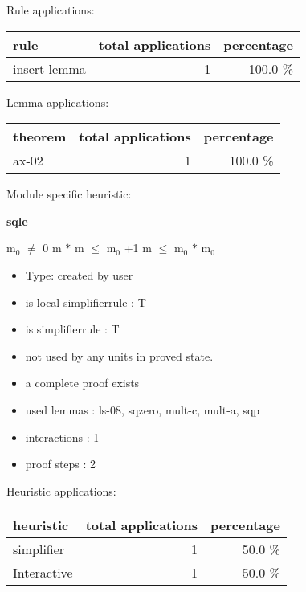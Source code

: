 \documentclass[a4paper]{article}
\begin{document}
Rule applications:

\begin{supertabular}{l|r|r}
rule	        & total applications & percentage \\ \hline
insert lemma & 1 & 100.0 \% \\

\end{supertabular}

Lemma applications:

\begin{supertabular}{l|r|r}
theorem	        & total applications & percentage \\ \hline
ax-02 & 1 & 100.0 \% \\

\end{supertabular}

Module specific heuristic:

\pagebreak

{\LARGE\bf sqle}\label{lemma-sqle}

\medskip

 \Fol $\mbox{m}_{0}$ $\neq$ 0 \And m $*$ m $\le$ $\mbox{m}_{0}$ +1 \Imp m $\le$ $\mbox{m}_{0}$ $*$ $\mbox{m}_{0}$

\begin{itemize}

\item Type: created by user

\item is local simplifierrule : T
\item is simplifierrule : T
\item not used by any units in proved state.
\item       a complete proof exists
\item       used lemmas  : ls-08, sqzero, mult-c, mult-a, sqp
\item       interactions : 1
\item       proof steps  : 2
\end{itemize}

\medskip


Heuristic applications:

\begin{supertabular}{l|r|r}
heuristic	& total applications & percentage \\ \hline
simplifier & 1 & 50.0 \% \\
Interactive & 1 & 50.0 \% \\

\end{supertabular}
\end{document}
